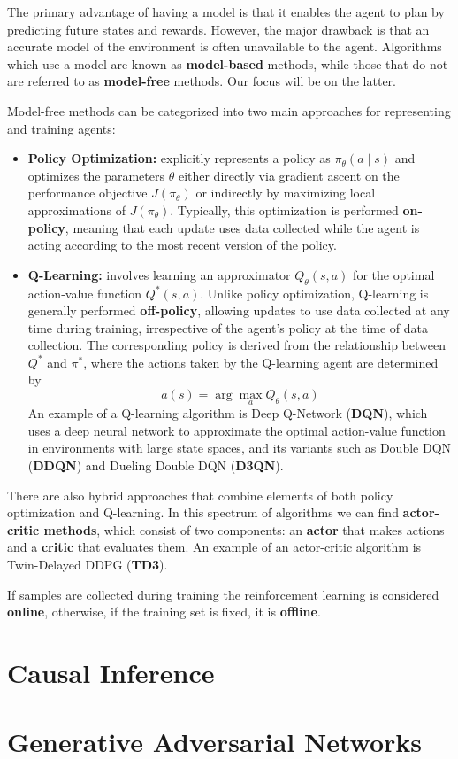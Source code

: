 The primary advantage of having a model is that it enables the agent
to plan by predicting future states and rewards.
However, the major drawback is that an accurate model of the environment
is often unavailable to the agent.
Algorithms which use a model are known as \textbf{model-based} methods,
while those that do not are referred to as \textbf{model-free} methods.
Our focus will be on the latter.

Model-free methods can be categorized into two main approaches
for representing and training agents:
\begin{itemize}
    \item \textbf{Policy Optimization:} explicitly represents a policy
    as \( \pi_{\theta}(a \mid s) \) and optimizes the parameters \( \theta \)
    either directly via gradient ascent on the performance objective
    \( J(\pi_{\theta}) \) or indirectly by maximizing local approximations
    of \( J(\pi_{\theta}) \).
    Typically, this optimization is performed \textbf{on-policy},
    meaning that each update uses data collected while the agent is acting
    according to the most recent version of the policy.

    \item \textbf{Q-Learning:} involves learning an approximator
    \( Q_{\theta}(s,a) \) for the optimal action-value function \( Q^*(s,a) \).
    Unlike policy optimization, Q-learning is generally performed \textbf{off-policy},
    allowing updates to use data collected at any time during training,
    irrespective of the agent's policy at the time of data collection.
    The corresponding policy is derived from the relationship between
    \( Q^* \) and \( \pi^* \), where the actions taken by the Q-learning
    agent are determined by
    $$ a(s) = \arg \max_a Q_{\theta}(s,a) $$
    An example of a Q-learning algorithm is Deep Q-Network (\textbf{DQN}),
    which uses a deep neural network to approximate the optimal action-value
    function in environments with large state spaces,
    and its variants such as Double DQN (\textbf{DDQN}) and
    Dueling Double DQN (\textbf{D3QN}).

\end{itemize}

There are also hybrid approaches that combine elements
of both policy optimization and Q-learning.
In this spectrum of algorithms we can find 
\textbf{actor-critic methods}, which consist of two components:
an \textbf{actor} that makes actions and a \textbf{critic} that evaluates them.
An example of an actor-critic algorithm is Twin-Delayed DDPG (\textbf{TD3}).

If samples are collected during training the reinforcement learning is
considered \textbf{online}, otherwise,
if the training set is fixed, it is \textbf{offline}.

\section{Causal Inference}

\cite{Neal_2020a}

\section{Generative Adversarial Networks}